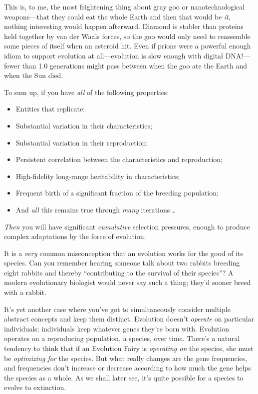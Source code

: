 {{
 This is, to me, the most frightening thing about gray goo or
nanotechnological weapons---that they could eat the whole Earth and
then that would be \textit{it}, nothing interesting would happen
afterward. Diamond is stabler than proteins held together by van der
Waals forces, so the goo would only need to reassemble some pieces of
itself when an asteroid hit. Even if prions were a powerful enough
idiom to support evolution at all---evolution is slow enough with
digital DNA!---fewer than 1.0 generations might pass between when the
goo ate the Earth and when the Sun died.}

{
 To sum up, if you have \textit{all} of the following properties:}

\begin{itemize}
\item  Entities that replicate;
\item  Substantial variation in their characteristics;
\item  Substantial variation in their reproduction;
\item Persistent correlation between the characteristics and
reproduction;
\item  High-fidelity long-range heritability in characteristics;
\item  Frequent birth of a significant fraction of the breeding
  population;
\item And \textit{all} this remains true through \textit{many}
  iterations\,\ldots
\end{itemize}

{
 \textit{Then} you will have significant \textit{cumulative}
selection pressures, enough to produce complex adaptations by the force
of evolution.}

\myendsectiontext


{
 It is a \textit{very} common misconception that an evolution works
for the good of its species. Can you remember hearing someone talk
about two rabbits breeding eight rabbits and thereby
``contributing to the survival of their
species''? A modern evolutionary biologist would
never say such a thing; they'd sooner breed with a
rabbit. }

{
 It's yet another case where you've
got to simultaneously consider multiple abstract concepts and keep them
distinct. Evolution doesn't \textit{operate} on
particular individuals; individuals keep whatever genes
they're born with. Evolution operates on a reproducing
population, a species, over time. There's a natural
tendency to think that if an Evolution Fairy is \textit{operating on}
the species, she must be \textit{optimizing for} the species. But what
really changes are the gene frequencies, and frequencies
don't increase or decrease according to how much the
gene helps the species as a whole. As we shall later see,
it's quite possible for a species to evolve to
extinction.}

}
